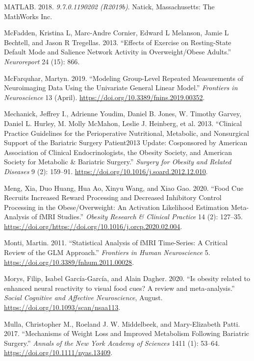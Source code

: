 \documentclass[
]{article}
\begin{document}
\leavevmode\hypertarget{ref-MATLAB2018}{}%
MATLAB. 2018. \emph{9.7.0.1190202 (R2019b)}. Natick, Massachusetts: The MathWorks Inc.

\leavevmode\hypertarget{ref-McFadden_2013}{}%
McFadden, Kristina L, Marc-Andre Cornier, Edward L Melanson, Jamie L Bechtell, and Jason R Tregellas. 2013. ``Effects of Exercise on Resting-State Default Mode and Salience Network Activity in Overweight/Obese Adults.'' \emph{Neuroreport} 24 (15): 866.

\leavevmode\hypertarget{ref-McFarquhar_2019}{}%
McFarquhar, Martyn. 2019. ``Modeling Group-Level Repeated Measurements of Neuroimaging Data Using the Univariate General Linear Model.'' \emph{Frontiers in Neuroscience} 13 (April). \url{https://doi.org/10.3389/fnins.2019.00352}.

\leavevmode\hypertarget{ref-Mechanick_2013}{}%
Mechanick, Jeffrey I., Adrienne Youdim, Daniel B. Jones, W. Timothy Garvey, Daniel L. Hurley, M. Molly McMahon, Leslie J. Heinberg, et al. 2013. ``Clinical Practice Guidelines for the Perioperative Nutritional, Metabolic, and Nonsurgical Support of the Bariatric Surgery Patient2013 Update: Cosponsored by American Association of Clinical Endocrinologists, the Obesity Society, and American Society for Metabolic \& Bariatric Surgery.'' \emph{Surgery for Obesity and Related Diseases} 9 (2): 159--91. \url{https://doi.org/10.1016/j.soard.2012.12.010}.

\leavevmode\hypertarget{ref-Meng_2020}{}%
Meng, Xia, Duo Huang, Hua Ao, Xinyu Wang, and Xiao Gao. 2020. ``Food Cue Recruits Increased Reward Processing and Decreased Inhibitory Control Processing in the Obese/Overweight: An Activation Likelihood Estimation Meta-Analysis of fMRI Studies.'' \emph{Obesity Research \& Clinical Practice} 14 (2): 127--35. \url{https://doi.org/https://doi.org/10.1016/j.orcp.2020.02.004}.

\leavevmode\hypertarget{ref-Monti_2011}{}%
Monti, Martin. 2011. ``Statistical Analysis of fMRI Time-Series: A Critical Review of the GLM Approach.'' \emph{Frontiers in Human Neuroscience} 5. \url{https://doi.org/10.3389/fnhum.2011.00028}.

\leavevmode\hypertarget{ref-Morys_2020}{}%
Morys, Filip, Isabel García-García, and Alain Dagher. 2020. ``Is obesity related to enhanced neural reactivity to visual food cues? A review and meta-analysis.'' \emph{Social Cognitive and Affective Neuroscience}, August. \url{https://doi.org/10.1093/scan/nsaa113}.

\leavevmode\hypertarget{ref-Mulla_2017}{}%
Mulla, Christopher M., Roeland J. W. Middelbeek, and Mary-Elizabeth Patti. 2017. ``Mechanisms of Weight Loss and Improved Metabolism Following Bariatric Surgery.'' \emph{Annals of the New York Academy of Sciences} 1411 (1): 53--64. \url{https://doi.org/10.1111/nyas.13409}.
\end{document}
